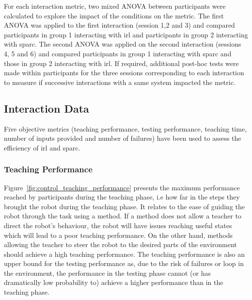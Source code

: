 For each interaction metric, two mixed ANOVA between participants were calculated to explore the impact of the conditions on the metric. The first ANOVA was applied to the first interaction (session 1,2 and 3) and compared participants in group 1 interacting with \gls{irl} and participants in group 2 interacting with \gls{sparc}. The second ANOVA was applied on the second interaction (sessions 4, 5 and 6) and compared participants in group 1 interacting with \gls{sparc} and those in group 2 interacting with \gls{irl}. If required, additional post-hoc tests were made within participants for the three sessions corresponding to each interaction to measure if successive interactions with a same system impacted the metric.



\subsection{Interaction Data}

Five objective metrics (teaching performance, testing performance, teaching time, number of inputs provided and number of failures) have been used to assess the efficiency of \gls{irl} and \gls{sparc}. 

\subsubsection{Teaching Performance}

Figure~\ref{fig:control_teaching_performance} presents the maximum performance reached by participants during the teaching phase, i.e how far in the steps they brought the robot during the teaching phase. It relates to the ease of guiding the robot through the task using a method. If a method does not allow a teacher to direct the robot's behaviour, the robot will have issues reaching useful states which will lead to a poor teaching performance. On the other hand, methods allowing the teacher to steer the robot to the desired parts of the environment should achieve a high teaching performance. The teaching performance is also an upper bound for the testing performance as, due to the risk of failures or loop in the environment, the performance in the testing phase cannot (or has dramatically low probability to) achieve a higher performance than in the teaching phase.

